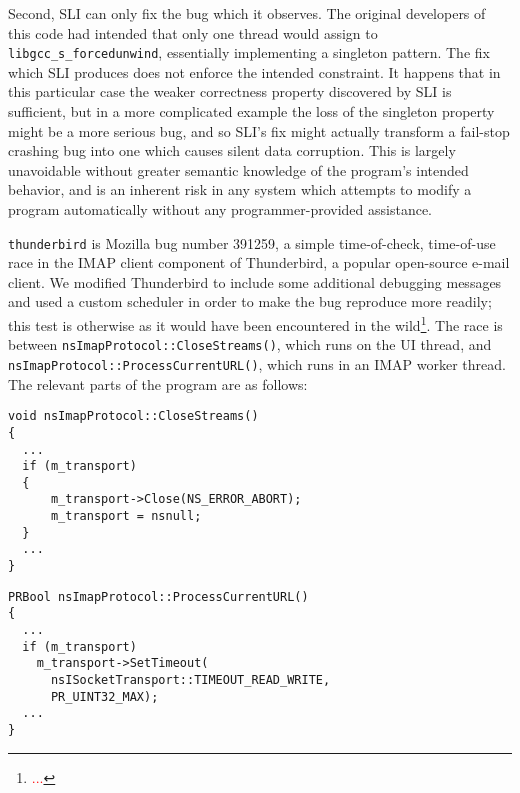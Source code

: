 \documentclass[10pt,twocolumn,preprint,natbib,authoryear]{sigplanconf}
\newcommand{\editorial}[1]{\textcolor{red}{\footnote{\textcolor{red}{#1}}}}
\begin{document}
Second, SLI can only fix the bug which it observes.  The original
developers of this code had intended that only one thread would assign
to \verb|libgcc_s_forcedunwind|, essentially implementing a singleton
pattern.  The fix which SLI produces does not enforce the intended
constraint.  It happens that in this particular case the weaker
correctness property discovered by SLI is sufficient, but in a more
complicated example the loss of the singleton property might be a more
serious bug, and so SLI's fix might actually transform a fail-stop
crashing bug into one which causes silent data corruption.  This is
largely unavoidable without greater semantic knowledge of the
program's intended behavior, and is an inherent risk in any system
which attempts to modify a program automatically without any
programmer-provided assistance.

\verb|thunderbird| is Mozilla bug number
391259\cite{thunderbird39125}, a simple time-of-check, time-of-use
race in the IMAP client component of Thunderbird, a popular
open-source e-mail client.  We modified Thunderbird to include some
additional debugging messages and used a custom scheduler in order to
make the bug reproduce more readily; this test is otherwise as it
would have been encountered in the wild\editorial{...}.  The race is
between \verb|nsImapProtocol::CloseStreams()|, which runs on the UI
thread, and \verb|nsImapProtocol::ProcessCurrentURL()|, which runs in
an IMAP worker thread.  The relevant parts of the program are as
follows:

\begin{verbatim}
void nsImapProtocol::CloseStreams()
{
  ...
  if (m_transport)
  {
      m_transport->Close(NS_ERROR_ABORT);
      m_transport = nsnull;
  }
  ...
}
\end{verbatim}

\begin{verbatim}
PRBool nsImapProtocol::ProcessCurrentURL()
{
  ...
  if (m_transport)
    m_transport->SetTimeout(
      nsISocketTransport::TIMEOUT_READ_WRITE,
      PR_UINT32_MAX);
  ...
}
\end{verbatim}
\end{document}
